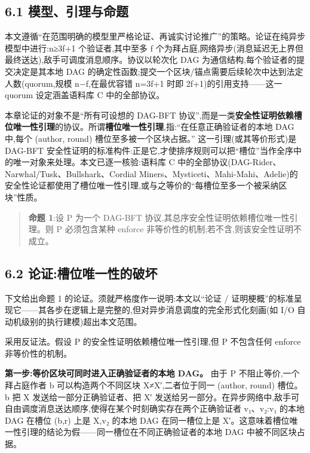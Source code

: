 \documentclass[UTF8,fontset=windows,a4paper,11pt]{ctexart}
\begin{document}
\subsection{6.1
模型、引理与命题}\label{ux6a21ux578bux5f15ux7406ux4e0eux547dux9898}

本文遵循``在范围明确的模型里严格论证、再诚实讨论推广''的策略。论证在纯异步模型中进行:n≥3f+1
个验证者,其中至多 f
个为拜占庭,网络异步(消息延迟无上界但最终送达),敌手可调度消息顺序。协议以轮次化
DAG 为通信结构,每个验证者的提交决定是其本地 DAG
的确定性函数;提交一个区块/锚点需要后续轮次中达到法定人数(quorum,规模
n−f,在最优容错 n=3f+1 时即 2f+1)的引用支持------这一 quorum
设定涵盖语料库 C 中的全部协议。

本章论证的对象不是``所有可设想的 DAG-BFT
协议'',而是一类\textbf{安全性证明依赖槽位唯一性引理}的协议。所谓\textbf{槽位唯一性引理},指:``在任意正确验证者的本地
DAG 中,每个 (author, round) 槽位至多被一个区块占据。''
这一引理(或其等价形式)是 DAG-BFT
安全性证明的标准构件:正是它,才使排序规则可以把``槽位''当作全序中的唯一对象来处理。本文已逐一核验:语料库
C 中的全部协议(DAG-Rider、Narwhal/Tusk、Bullshark、Cordial
Miners、Mysticeti、Mahi-Mahi、Adelie)的安全性论证都使用了槽位唯一性引理,或与之等价的``每槽位至多一个被采纳区块''性质。

\begin{quote}
\textbf{命题 1}:设 P 为一个 DAG-BFT
协议,其总序安全性证明依赖槽位唯一性引理。则 P 必须包含某种 enforce
非等价性的机制;若不含,则该安全性证明不成立。
\end{quote}

\subsection{6.2
论证:槽位唯一性的破坏}\label{ux8bbaux8bc1ux69fdux4f4dux552fux4e00ux6027ux7684ux7834ux574f}

下文给出命题 1 的论证。须就严格度作一说明:本文以``论证 /
证明梗概''的标准呈现它------其各步在逻辑上是完整的,但对异步消息调度的完全形式化刻画(如
I/O 自动机级别的执行建模)超出本文范围。

采用反证法。假设 P 的安全性证明依赖槽位唯一性引理,但 P 不包含任何
enforce 非等价性的机制。

\textbf{第一步:等价区块可同时进入正确验证者的本地 DAG。} 由于 P
不阻止等价,一个拜占庭作者 b 可以构造两个不同区块 X≠X′,二者位于同一
(author, round) 槽位。b 把 X 发送给一部分正确验证者、把 X′
发送给另一部分。在异步网络中,敌手可自由调度消息送达顺序,使得在某个时刻确实存在两个正确验证者
v₁、v₂:v₁ 的本地 DAG 在槽位 (b,r) 上是 X,v₂ 的本地 DAG 在同一槽位上是
X′。这意味着槽位唯一性引理的结论为假------同一槽位在不同正确验证者的本地
DAG 中被不同区块占据。
\end{document}
